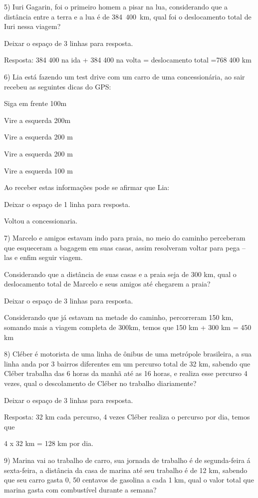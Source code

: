 {5) Iuri Gagarin, foi o primeiro homem a pisar na lua, considerando que a
distância entre a terra e a lua é de 384~400~km, qual foi o deslocamento
total de Iuri nessa viagem?

Deixar o espaço de 3 linhas para resposta.

Resposta: 384 400 na ida + 384 400 na volta = deslocamento total =768
400 km

6) Lia está fazendo um test drive com um carro de uma concessionária, ao
sair recebeu as seguintes dicas do GPS:

Siga em frente 100m

Vire a esquerda 200m

Vire a esquerda 200 m

Vire a esquerda 200 m

Vire a esquerda 100 m

Ao receber estas informações pode se afirmar que Lia:

Deixar o espaço de 1 linha para resposta.

Voltou a concessionaria.

7) Marcelo e amigos estavam indo para praia, no meio do caminho
perceberam que esqueceram a bagagem em suas casas, assim resolveram
voltar para pega -- las e enfim seguir viagem.

Considerando que a distância de suas casas e a praia seja de 300 km,
qual o deslocamento total de Marcelo e seus amigos até chegarem a praia?

Deixar o espaço de 3 linhas para resposta.

Considerando que já estavam na metade do caminho, percorreram 150 km,
somando mais a viagem completa de 300km, temos que 150 km + 300 km = 450
km

8) Cléber é motorista de uma linha de ônibus de uma metrópole
brasileira, a sua linha anda por 3 bairros diferentes em um percurso
total de 32 km, sabendo que Cléber trabalha das 6 horas da manhã até as
16 horas, e realiza esse percurso 4 vezes, qual o descolamento de Cléber
no trabalho diariamente?

Deixar o espaço de 3 linhas para resposta.

Resposta: 32 km cada percurso, 4 vezes Cléber realiza o percurso por
dia, temos que

4 x 32 km = 128 km por dia.

9) Marina vai ao trabalho de carro, sua jornada de trabalho é de
segunda-feira á sexta-feira, a distância da casa de marina até seu
trabalho é de 12 km, sabendo que seu carro gasta 0, 50 centavos de
gasolina a cada 1 km, qual o valor total que marina gasta com
combustível durante a semana?

}

